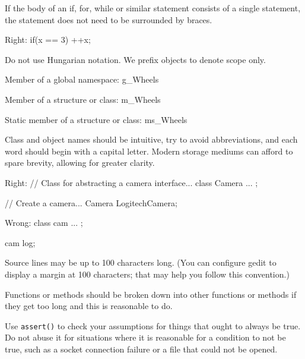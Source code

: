 \item
If the body of an if, for, while or similar statement consists of a single statement, the statement does not need to be surrounded by braces.


Right:
\startCodeExample
if(x == 3)
  ++x;
\stopCodeExample

\stopitemize



\startitemize[4]
\item
Do not use Hungarian notation. We prefix objects to denote scope only.


Member of a global namespace:
\startCodeExample
g_Wheels
\stopCodeExample

Member of a structure or class:
\startCodeExample
m_Wheels
\stopCodeExample

Static member of a structure or class:
\startCodeExample
ms_Wheels
\stopCodeExample

\item
Class and object names should be intuitive, try to avoid abbreviations, and each word should begin with a capital letter. Modern storage mediums can afford to spare brevity, allowing for greater clarity.


Right:
\startCodeExample
// Class for abstracting a camera interface...
class Camera
{
    ...
};

// Create a camera...
Camera LogitechCamera;
\stopCodeExample

Wrong:
\startCodeExample
class cam
{
    ...
};

cam log;
\stopCodeExample

\stopitemize


\startitemize[4]
\item
Source lines may be up to 100 characters long. (You can configure gedit to display a margin at 100 characters; that may help you follow this convention.)

\item
Functions or methods should be broken down into other functions or methods if they get too long and this is reasonable to do.

\item
Use {\tt assert()} to check your assumptions for things that ought to always be true. Do not abuse it for situations where it is reasonable for a condition to not be true, such as a socket connection failure or a file that could not be opened.

